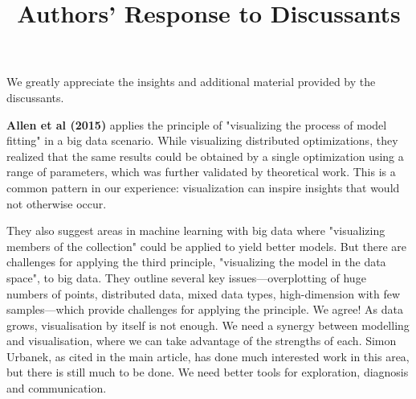 \documentclass[preprint]{imsart}
\begin{document}
\begin{frontmatter}
\title{Authors' Response to Discussants}
\end{frontmatter}

We greatly appreciate the insights and additional material provided by the discussants.


\textbf{Allen et al (2015)} applies the principle of "visualizing the process of model fitting" in a big data scenario. While visualizing distributed optimizations, they realized that the same results could be obtained by a single optimization using a range of parameters, which was further validated by theoretical work. This is a common pattern in our experience: visualization can inspire insights that would not otherwise occur.

They also suggest areas in machine learning with big data where "visualizing members of the collection" could be applied to yield better models. But there are challenges for applying the third principle, "visualizing the model in the data space", to big data. They outline several key issues---overplotting of huge numbers of points, distributed data, mixed data types, high-dimension with few samples---which provide challenges for applying the principle. We agree! As data grows, visualisation by itself is not enough. We need a synergy between modelling and visualisation, where we can take advantage of the strengths of each. Simon Urbanek, as cited in the main article, has done much interested work in this area, but there is still much to be done. We need better tools for exploration, diagnosis and communication.
\end{document}
